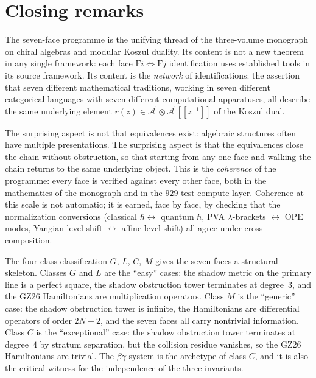 \documentclass[11pt]{article}
\theoremstyle{plain}
\theoremstyle{definition}
\theoremstyle{remark}
\newcommand{\cA}{\mathcal{A}}
\begin{document}

\section{Closing remarks}\label{sec:closing}

The seven-face programme is the unifying thread of the three-volume
monograph on chiral algebras and modular Koszul duality. Its
content is not a new theorem in any single framework: each face
$\mathrm{F}i\Leftrightarrow\mathrm{F}j$ identification uses
established tools in its source framework. Its content is the
\emph{network} of identifications: the assertion that seven
different mathematical traditions, working in seven different
categorical languages with seven different computational
apparatuses, all describe the same underlying element
$r(z)\in\cA^{!}\otimes\cA^{!}[\![z^{-1}]\!]$ of the Koszul dual.

The surprising aspect is not that equivalences exist: algebraic
structures often have multiple presentations. The surprising
aspect is that the equivalences close the chain without
obstruction, so that starting from any one face and walking the
chain returns to the same underlying object. This is the
\emph{coherence} of the programme: every face is verified against
every other face, both in the mathematics of the monograph and in
the $929$-test compute layer. Coherence at this scale is not
automatic; it is earned, face by face, by checking that the
normalization conversions (classical $\hbar\leftrightarrow$
quantum $\hbar$, PVA $\lambda$-brackets $\leftrightarrow$ OPE
modes, Yangian level shift $\leftrightarrow$ affine level shift)
all agree under cross-composition.

The four-class classification $G$, $L$, $C$, $M$ gives the seven
faces a structural skeleton. Classes $G$ and $L$ are the
``easy'' cases: the shadow metric on the primary line is a
perfect square, the shadow obstruction tower terminates at degree~$3$, and the
GZ26 Hamiltonians are multiplication operators. Class $M$ is the
``generic'' case: the shadow obstruction tower is infinite, the Hamiltonians
are differential operators of order $2N-2$, and the seven faces
all carry nontrivial information. Class $C$ is the
``exceptional'' case: the shadow obstruction tower terminates at degree~$4$ by
stratum separation, but the collision residue vanishes, so the
GZ26 Hamiltonians are trivial. The $\beta\gamma$ system is the
archetype of class $C$, and it is also the critical witness for
the independence of the three invariants.
\end{document}
